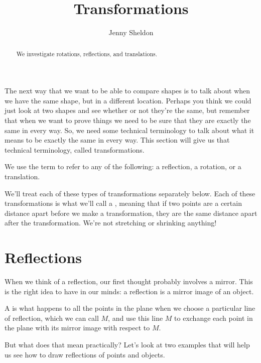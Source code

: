 \documentclass{ximera}
\title{Transformations}
\author{Jenny Sheldon}
\begin{document}
\begin{abstract}
We investigate rotations, reflections, and translations.
\end{abstract}
\maketitle

The next way that we want to be able to compare shapes is to talk about when we have the same shape, but in a different location. Perhaps you think we could just look at two shapes and see whether or not they're the same, but remember that when we want to prove things we need to be sure that they are exactly the same in every way. So, we need some technical terminology to talk about what it means to be exactly the same in every way. This section will give us that technical terminology, called transformations.
\begin{definition}
We use the term  to refer to any of the following: a reflection, a rotation, or a translation.
\end{definition}
We'll treat each of these types of transformations separately below. Each of these transformations is what we'll call a , meaning that if two points are a certain distance apart before we make a transformation, they are the same distance apart after the transformation. We're not stretching or shrinking anything!

\section{Reflections}
When we think of a reflection, our first thought probably involves a mirror. This is the right idea to have in our minds: a reflection is a mirror image of an object.
\begin{definition}
A  is what happens to all the points in the plane when we choose a particular line of reflection, which we can call $M$, and use this line $M$ to exchange each point in the plane with its mirror image with respect to $M$.
\end{definition}
 But what does that mean practically? Let's look at two examples that will help us see how to draw reflections of points and objects.
\end{document}
